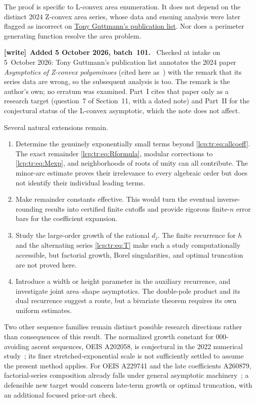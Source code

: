 \documentclass[11pt]{article}
\numberwithin{equation}{section}
\theoremstyle{definition}\newtheorem{definition}[theorem]{Definition}
\theoremstyle{remark}\newtheorem{remark}[theorem]{Remark}
\newenvironment{writenote}[1][]{\par\smallskip\begingroup\small
 \noindent\textbf{[write]}\if\relax\detokenize{#1}\relax\else~\textbf{#1.}\fi\ }%
 {\par\endgroup\smallskip}
\begin{document}
The proof is specific to L-convex area enumeration. It does not depend on the distinct 2024 Z-convex area series, whose data and ensuing analysis were later flagged as incorrect on \href{https://blogs.unimelb.edu.au/tony-guttmann/sample-page/publications/publications-2020/}{Tony Guttmann's publication list}. Nor does a perimeter generating function resolve the area problem.

\begin{writenote}[Added 5 October 2026, batch~101]
Checked at intake on 5~October 2026: Tony Guttmann's publication list
annotates the 2024 paper \emph{Asymptotics of Z-convex polyominoes}
(cited here as~\cite{zconvex}) with the remark that its series data are
wrong, so the subsequent analysis is too. The remark is the author's own;
no erratum was examined. Part~I cites that paper only as a research target
(question~7 of Section~11, with a dated note) and Part~II for the
conjectural status of the L-convex asymptotic, which the note does not
affect.
\end{writenote}


Several natural extensions remain.
\begin{enumerate}
\item Determine the genuinely exponentially small terms beyond \eqref{lcp:tr:eq:allcoeff}. The exact remainder \eqref{lcp:tr:eq:Rformula}, modular corrections to \eqref{lcp:tr:eq:Mexp}, and neighborhoods of roots of unity can all contribute. The minor-arc estimate proves their irrelevance to every algebraic order but does not identify their individual leading terms.
\item Make remainder constants effective. This would turn the eventual inverse-rounding results into certified finite cutoffs and provide rigorous finite-$n$ error bars for the coefficient expansion.
\item Study the large-order growth of the rational $d_j$. The finite recurrence for $h$ and the alternating series \eqref{lcp:tr:eq:T} make such a study computationally accessible, but factorial growth, Borel singularities, and optimal truncation are not proved here.
\item Introduce a width or height parameter in the auxiliary recurrence, and investigate joint area--shape asymptotics. The double-pole product and its dual recurrence suggest a route, but a bivariate theorem requires its own uniform estimates.
\end{enumerate}

Two other sequence families remain distinct possible research directions rather than consequences of this result. The normalized growth constant for $000$-avoiding ascent sequences, OEIS A202058, is conjectural in the 2022 numerical study~\cite{lcp-tr-conway}; its finer stretched-exponential scale is not sufficiently settled to assume the present method applies. For OEIS A229741 and the late coefficients A260879, factorial-series composition already falls under general asymptotic machinery~\cite{lcp-tr-borinsky}; a defensible new target would concern late-term growth or optimal truncation, with an additional focused prior-art check.
\end{document}
